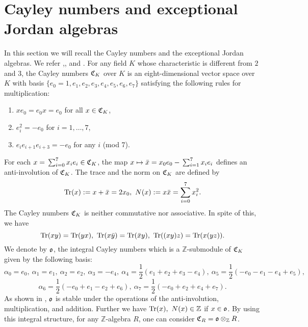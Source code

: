 \documentclass[11pt]{amsart}
\numberwithin{equation}{section}
\theoremstyle{definition}
\begin{document}
\section{Cayley numbers and exceptional Jordan algebras}\label{Cayley}
In this section we will recall the Cayley numbers and the exceptional Jordan algebras. We refer \cite{B},\cite{Coxeter}, and \cite{kim}. 
For any field $K$ whose characteristic is different from $2$ and $3$, 
the Cayley numbers $\frak C_K$ over $K$ is an eight-dimensional vector space over $K$ with basis 
$\{e_0=1,e_1,e_2,e_3,e_4,e_5,e_6,e_7\}$ satisfying the following rules for multiplication:
\begin{enumerate}
\item  $xe_0=e_0x=e_0$ for all $x\in\frak C_K$,
\item $e^2_i=-e_0$ for $i=1,\ldots, 7$,
\item $e_ie_{i+1}e_{i+3}=-e_0$ for any $i$ (mod 7).  
\end{enumerate}
For each $x={\displaystyle}\sum_{i=0}^7x_ie_i\in \frak C_K$, 
the map $x\mapsto \bar{x}=x_0e_0-{\displaystyle}\sum_{i=1}^7x_ie_i$ defines an anti-involution of $\frak C_K$.  
The trace and the norm on $\frak C_K$ are defined by 
$${{\rm Tr}}(x):=x+\bar{x}=2x_0,\ N(x):=x\bar{x}=\sum_{i=0}^7x^2_i.
$$
The Cayley numbers $\frak C_K$ is neither commutative nor associative. In spite of this, we have 
$${{\rm Tr}}(xy)={{\rm Tr}}(yx),\ {{\rm Tr}}(x\bar{y})={{\rm Tr}}(\bar{x}y),\ {{\rm Tr}}((xy)z)={{\rm Tr}}(x(yz)).$$
We denote by $\frak o$, the integral Cayley numbers 
which is a ${\mathbb{Z}}$-submodule of $\frak C_K$ given by the following basis:
$$\alpha_0=e_0,\ \alpha_1=e_1,\ \alpha_2=e_2,\ \alpha_3=-e_4,\ 
\alpha_4=\frac{1}{2}(e_1+e_2+e_3-e_4),\ \alpha_5=\frac{1}{2}(-e_0-e_1-e_4+e_5),$$
$$\alpha_6=\frac{1}{2}(-e_0+e_1-e_2+e_6),\ \alpha_7=\frac{1}{2}(-e_0+e_2+e_4+e_7).$$
As shown in \cite{Coxeter}, $\frak o$ is stable under the operations of the anti-involution, multiplication, and 
addition. Further we have ${{\rm Tr}}(x),\ N(x)\in {\mathbb{Z}}$ if $x\in \frak o$. By using this integral structure, 
for any ${\mathbb{Z}}$-algebra $R$, one can consider $\frak C_R=\frak o\otimes_{\mathbb{Z}} R$. 
\end{document}
